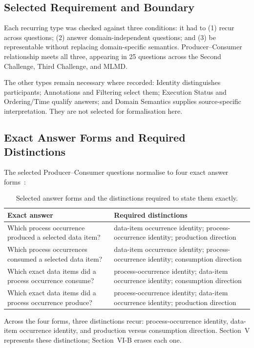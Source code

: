 \documentclass[conference]{IEEEtran}
\theoremstyle{tideproposition}
\begin{document}
\subsection{Selected Requirement and Boundary}
Each recurring type was checked against three conditions: it had to (1) recur across questions; (2) answer domain-independent questions; and (3) be representable without replacing domain-specific semantics. Producer--Consumer relationship meets all three, appearing in 25 questions across the Second Challenge, Third Challenge, and MLMD.

The other types remain necessary where recorded: Identity distinguishes participants; Annotations and Filtering select them; Execution Status and Ordering/Time qualify answers; and Domain Semantics supplies source-specific interpretation. They are not selected for formalisation here.

\subsection{Exact Answer Forms and Required Distinctions}
The selected Producer--Consumer questions normalise to four exact answer forms~\cite{artifact}:

\begin{table}[H]
\caption{Selected answer forms and the distinctions required to state them exactly.}
\label{tab:answer-distinctions}
\centering
\footnotesize
\setlength{\tabcolsep}{2.5pt}
\begin{tabularx}{\columnwidth}{@{}Y Y@{}}
\toprule
Exact answer & Required distinctions\\
\midrule
Which process occurrence produced a selected data item? & data-item occurrence identity; process-occurrence identity; production direction\\
Which process occurrences consumed a selected data item? & data-item occurrence identity; process-occurrence identity; consumption direction\\
Which exact data items did a process occurrence consume? & process-occurrence identity; data-item occurrence identity; consumption direction\\
Which exact data items did a process occurrence produce? & process-occurrence identity; data-item occurrence identity; production direction\\
\bottomrule
\end{tabularx}
\end{table}

Across the four forms, three distinctions recur: process-occurrence identity, data-item occurrence identity, and production versus consumption direction. Section~V represents these distinctions; Section~VI-B erases each one.
\end{document}
